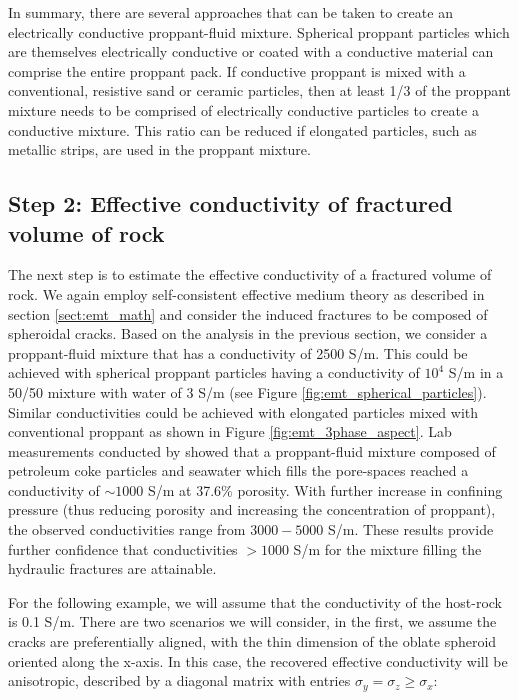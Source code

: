 

In summary, there are several approaches that can be taken to create an electrically conductive proppant-fluid mixture. Spherical proppant particles which are themselves electrically conductive or coated with a conductive material can comprise the entire proppant pack. If conductive proppant is mixed with a conventional, resistive sand or ceramic particles, then at least 1/3 of the proppant mixture needs to be comprised of electrically conductive particles to create a conductive mixture. This ratio can be reduced if elongated particles, such as metallic strips, are used in the proppant mixture.

\subsection{Step 2: Effective conductivity of fractured volume of rock}
The next step is to estimate the effective conductivity of a fractured volume of rock. We again employ self-consistent effective medium theory as described in section \ref{sect:emt_math} and consider the induced fractures to be composed of spheroidal cracks. Based on the analysis in the previous section, we consider a proppant-fluid mixture that has a conductivity of 2500 S/m. This could be achieved with spherical proppant particles having a conductivity of $10^4$ S/m in a 50/50 mixture with water of 3 S/m (see Figure \ref{fig:emt_spherical_particles}). Similar conductivities could be achieved with elongated particles mixed with conventional proppant as shown in Figure \ref{fig:emt_3phase_aspect}. Lab measurements conducted by \cite{Zhang2016} showed that a proppant-fluid mixture composed of petroleum coke particles and seawater which fills the pore-spaces reached a conductivity of $\sim 1000$ S/m at 37.6\% porosity. With further increase in confining pressure (thus reducing porosity and increasing the concentration of proppant), the observed conductivities range from  $3000 - 5000$ S/m. These results provide further confidence that conductivities $> 1000$ S/m for the mixture filling the hydraulic fractures are attainable.


For the following example, we will assume that the conductivity of the host-rock is 0.1 S/m. There are two scenarios we will consider, in the first, we assume the cracks are preferentially aligned, with the thin dimension of the oblate spheroid oriented along the x-axis. In this case, the recovered effective conductivity will be anisotropic, described by a diagonal matrix with entries $\sigma_y = \sigma_z \geq \sigma_x:$


